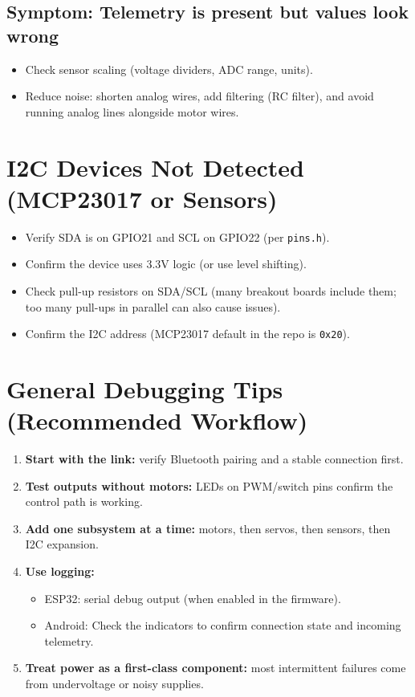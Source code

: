 \subsection*{Symptom: Telemetry is present but values look wrong}
\begin{itemize}
    \item Check sensor scaling (voltage dividers, ADC range, units).
    \item Reduce noise: shorten analog wires, add filtering (RC filter), and avoid running analog lines alongside motor wires.
\end{itemize}

\section{I2C Devices Not Detected (MCP23017 or Sensors)}
\label{sec:i2c}

\begin{itemize}
    \item Verify SDA is on GPIO21 and SCL on GPIO22 (per \texttt{pins.h}).
    \item Confirm the device uses 3.3V logic (or use level shifting).
    \item Check pull-up resistors on SDA/SCL (many breakout boards include them; too many pull-ups in parallel can also cause issues).
    \item Confirm the I2C address (MCP23017 default in the repo is \texttt{0x20}).
\end{itemize}

\section{General Debugging Tips (Recommended Workflow)}
\label{sec:debugging-tips}

\begin{enumerate}
    \item \textbf{Start with the link:} verify Bluetooth pairing and a stable connection first.
    \item \textbf{Test outputs without motors:} LEDs on PWM/switch pins confirm the control path is working.
    \item \textbf{Add one subsystem at a time:} motors, then servos, then sensors, then I2C expansion.
    \item \textbf{Use logging:}
    \begin{itemize}
        \item ESP32: serial debug output (when enabled in the firmware).
        \item Android: Check the indicators to confirm connection state and incoming telemetry.
    \end{itemize}
    \item \textbf{Treat power as a first-class component:} most intermittent failures come from undervoltage or noisy supplies.
\end{enumerate}